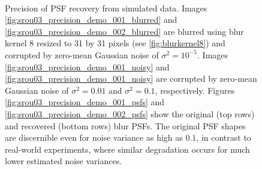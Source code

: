 \documentclass[12pt,notitlepage]{report}
\begin{document}
\begin{figure}[h]
	  ~
	  ~
  \caption[Precision of PSF recovery from simulated data.]{Precision of PSF recovery from simulated data. Images \ref{fig:srou03_precision_demo_001_blurred} and \ref{fig:srou03_precision_demo_002_blurred} are blurred using blur kernel 8 resized to 31 by 31 pixels (see \ref{fig:blurkernel8}) and corrupted by zero-mean Gaussian noise of $\sigma^2 = 10^{-5}$. Images \ref{fig:srou03_precision_demo_001_noisy} and \ref{fig:srou03_precision_demo_001_noisy} are corrupted by zero-mean Gaussian noise of $\sigma^2 = 0.01$ and $\sigma^2 = 0.1$, respectively. Figures \ref{fig:srou03_precision_demo_001_psfs} and \ref{fig:srou03_precision_demo_002_psfs} show the original (top rows) and recovered (bottom rows) blur PSFs. The original PSF shapes are discernible even for noise variance as high as $0.1$, in contrast to real-world experiments, where similar degradation occurs for much lower estimated noise variances.}  
  \label{fig:srou03_precision_demo}
\end{figure}
\end{document}
